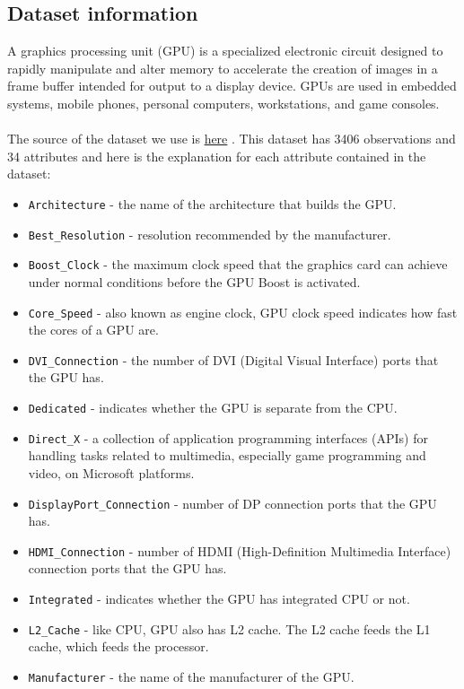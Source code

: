\documentclass[a4paper]{article}
\begin{document}
\subsection{Dataset information}
A graphics processing unit (GPU) is a specialized electronic circuit designed to rapidly manipulate and alter memory to accelerate the creation of images in a frame buffer intended for output to a display device. GPUs are used in embedded systems, mobile phones, personal computers, workstations, and game consoles.\\\\
The source of the dataset we use is \href{https://www.kaggle.com/iliassekkaf/computerparts}{here} \cite{bib4}. This dataset has 3406 observations and 34 attributes and here is the explanation for each attribute contained in the dataset:
\begin{itemize}
    \item \verb|Architecture| - the name of the architecture that builds the GPU.
    \item \verb|Best_Resolution| - resolution recommended by the manufacturer.
    \item \verb|Boost_Clock| - the maximum clock speed that the graphics card can achieve under normal conditions before the GPU Boost is activated.
    \item \verb|Core_Speed| - also known as engine clock, GPU clock speed indicates how fast the cores of a GPU are.
    \item \verb|DVI_Connection| - the number of DVI (Digital Visual Interface) ports that the GPU has.
    \item \verb|Dedicated| - indicates whether the GPU is separate from the CPU.
    \item \verb|Direct_X| - a collection of application programming interfaces (APIs) for handling tasks related to multimedia, especially game programming and video, on Microsoft platforms.
    \item \verb|DisplayPort_Connection| - number of DP connection ports that the GPU has.
    \item \verb|HDMI_Connection| - number of HDMI (High-Definition Multimedia Interface) connection ports that the GPU has.
    \item \verb|Integrated| - indicates whether the GPU has integrated CPU or not.
    \item \verb|L2_Cache| - like CPU, GPU also has L2 cache. The L2 cache feeds the L1 cache, which feeds the processor.
    \item \verb|Manufacturer| - the name of the manufacturer of the GPU.

\end{itemize}
\end{document}
